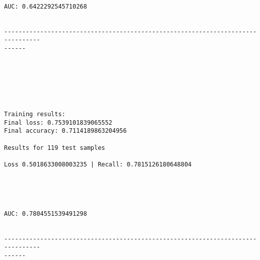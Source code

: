 \documentclass[11pt]{article}
\begin{document}
    \begin{center}
    \end{center}
    { \hspace*{\fill} \\}
    
    \begin{Verbatim}[commandchars=\\\{\}]
AUC: 0.6422292545710268


--------------------------------------------------------------------------------
------


    \end{Verbatim}

    \begin{center}
    \end{center}
    { \hspace*{\fill} \\}
    
    \begin{center}
    \end{center}
    { \hspace*{\fill} \\}
    
    \begin{Verbatim}[commandchars=\\\{\}]

Training results:
Final loss: 0.7539101839065552
Final accuracy: 0.7114189863204956

Results for 119 test samples

Loss 0.5018633008003235 | Recall: 0.7815126180648804



    \end{Verbatim}

    \begin{center}
    \end{center}
    { \hspace*{\fill} \\}
    
    \begin{Verbatim}[commandchars=\\\{\}]
AUC: 0.7804551539491298


--------------------------------------------------------------------------------
------


    \end{Verbatim}
\end{document}
